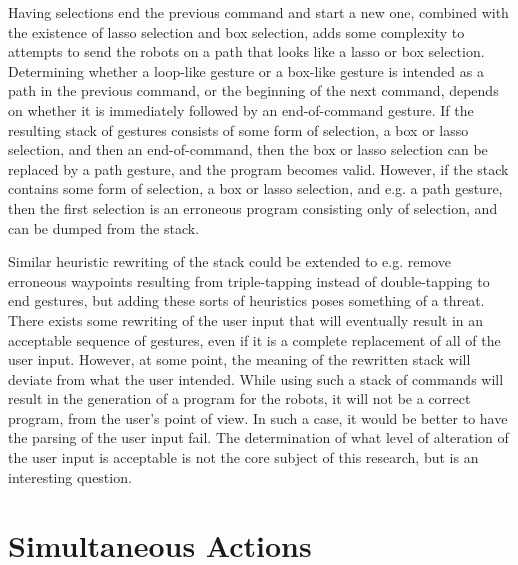 Having selections end the previous command and start a new one, combined with the existence of lasso selection and box selection, adds some complexity to attempts to send the robots on a path that looks like a lasso or box selection. 
Determining whether a loop-like gesture or a box-like gesture is intended as a path in the previous command, or the beginning of the next command, depends on whether it is immediately followed by an end-of-command gesture. 
If the resulting stack of gestures consists of some form of selection, a box or lasso selection, and then an end-of-command, then the box or lasso selection can be replaced by a path gesture, and the program becomes valid. 
However, if the stack contains some form of selection, a box or lasso selection, and e.g. a path gesture, then the first selection is an erroneous program consisting only of selection, and can be dumped from the stack. 

Similar heuristic rewriting of the stack could be extended to e.g. remove erroneous waypoints resulting from triple-tapping instead of double-tapping to end gestures, but adding these sorts of heuristics poses something of a threat. 
There exists some rewriting of the user input that will eventually result in an acceptable sequence of gestures, even if it is a complete replacement of all of the user input. 
However, at some point, the meaning of the rewritten stack will deviate from what the user intended. 
While using such a stack of commands will result in the generation of a program for the robots, it will not be a correct program, from the user's point of view. 
In such a case, it would be better to have the parsing of the user input fail. 
The determination of what level of alteration of the user input is acceptable is not the core subject of this research, but is an interesting question. 

\section{Simultaneous Actions}


